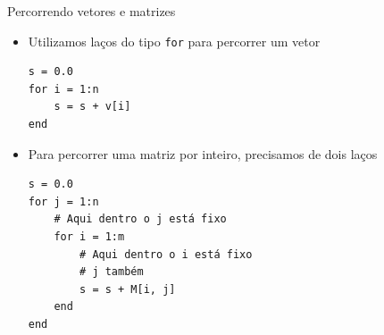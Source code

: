 \documentclass[]{beamer}
\newcommand{\code}[1]{\colorbox[gray]{0.8}{\texttt{#1}}}
\begin{document}
\begin{frame}[fragile]{Percorrendo vetores e matrizes}
  
  \begin{itemize}
  \item Utilizamos laços do tipo \code{for} para percorrer um vetor

    \begin{center}
      \begin{minipage}[c]{0.5\linewidth}
\begin{verbatim}
s = 0.0
for i = 1:n
    s = s + v[i]
end
\end{verbatim}
      \end{minipage}
    \end{center}
    
  \item Para percorrer uma matriz por inteiro, precisamos de
    \alert{dois laços}

    \begin{center}
      \begin{minipage}[c]{0.5\linewidth}
\begin{verbatim}
s = 0.0
for j = 1:n
    # Aqui dentro o j está fixo
    for i = 1:m
        # Aqui dentro o i está fixo
        # j também
        s = s + M[i, j]
    end
end
\end{verbatim}
      \end{minipage}
    \end{center}

  \end{itemize}

\end{frame}
\end{document}
